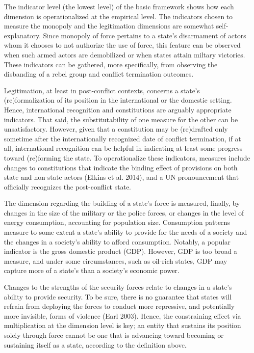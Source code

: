 \documentclass [11pt]{article}
\begin{document}
The indicator level (the lowest level) of the basic framework shows how each dimension is operationalized at the empirical level. The indicators chosen to measure the monopoly and the legitimation dimensions are somewhat self-explanatory. Since monopoly of force pertains to a state's disarmament of actors whom it chooses to not authorize the use of force, this feature can be observed when such armed actors are demobilized or when states attain miltary victories. These indicators can be gathered, more specifically, from observing the disbanding of a rebel group and conflict termination outcomes.

Legitimation, at least in post-conflict contexts, concerns a state's (re)formalization of its position in the international or the domestic setting. Hence, international recognition and constitutions are arguably appropriate indicators. That said, the substitutability of one measure for the other can be unsatisfactory. However, given that a constitution may be (re)drafted only sometime after the internationally recognized date of conflict termination, if at all, international recognition can be helpful in indicating at least some progress toward (re)forming the state. To operationalize these indicators, measures include changes to constitutions that indicate the binding effect of provisions on both state and non-state actors (Elkins et al. 2014), and a UN pronouncement that officially recognizes the post-conflict state.

The dimension regarding the building of a state's force is measured, finally, by changes in the size of the military or the police forces, or changes in the level of energy consumption, accounting for population size. Consumption patterns measure to some extent a state's ability to provide for the needs of a society and the changes in a society's ability to afford consumption. Notably, a popular indicator is the gross domestic product (GDP). However, GDP is too broad a measure, and under some circumstances, such as oil-rich states, GDP may capture more of a state's than a society's economic power.

Changes to the strengths of the security forces relate to changes in a state's ability to provide security. To be sure, there is no guarantee that states will refrain from deploying the forces to conduct more repressive, and potentially more invisible, forms of violence (Earl 2003). Hence, the constraining effect via multiplication at the dimension level is key; an entity that sustains its position solely through force cannot be one that is advancing toward becoming or sustaining itself as a state, according to the definition above. 
\end{document}
